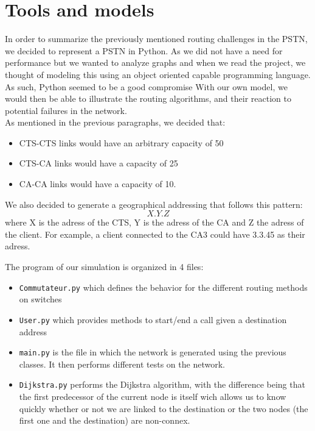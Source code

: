\documentclass[lettersize,journal]{IEEEtran} %
\begin{document}
\section{Tools and models}
In order to summarize the previously mentioned routing challenges in the PSTN, we decided to represent a PSTN in Python.
As we did not have a need for performance but we wanted to analyze graphs and when we read the project, we thought of
modeling this using an object oriented capable programming language. As such, Python seemed to be a good compromise
With our own model, we would then be able to illustrate the routing algorithms, and their reaction to potential failures in the
network.\\
As mentioned in the previous paragraphs, we decided that:
\begin{itemize}
        \item CTS-CTS links would have an arbitrary capacity of 50
        \item CTS-CA links would have a capacity of 25
        \item CA-CA links would have a capacity of 10.
\end{itemize}
We also decided to generate a geographical addressing that follows this pattern:
\[X.Y.Z\]
where X is the adress of the CTS, Y is the adress of the CA and Z the adress of the client.
For example, a client connected to the CA3 could have 3.3.45 as their adress.

The program of our simulation is organized in 4 files: 
\begin{itemize}
        \item \verb|Commutateur.py| which defines the behavior for the different routing methods on switches
        \item \verb|User.py| which provides methods to start/end a call given a destination address
        \item \verb|main.py| is the file in which the network is generated using the previous classes. It then 
        performs different tests on the network.
        \item \verb|Dijkstra.py| performs the Dijkstra algorithm, with the difference being that the first predecessor
        of the current node is itself wich allows us to know quickly whether or not we are linked to the destination or
        the two nodes (the first one and the destination) are non-connex. 
\end{itemize}
\end{document}
